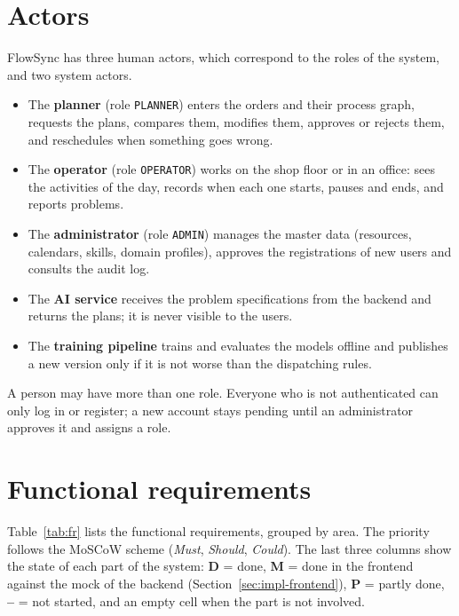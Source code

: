 \section{Actors}
\label{sec:actors}

FlowSync has three human actors, which correspond to the roles of the system, and two system
actors.
\begin{itemize}
  \item The \textbf{planner} (role \texttt{PLANNER}) enters the orders and their process graph,
        requests the plans, compares them, modifies them, approves or rejects them, and
        reschedules when something goes wrong.
  \item The \textbf{operator} (role \texttt{OPERATOR}) works on the shop floor or in an office:
        sees the activities of the day, records when each one starts, pauses and ends, and
        reports problems.
  \item The \textbf{administrator} (role \texttt{ADMIN}) manages the master data (resources,
        calendars, skills, domain profiles), approves the registrations of new users and
        consults the audit log.
  \item The \textbf{AI service} receives the problem specifications from the backend and returns
        the plans; it is never visible to the users.
  \item The \textbf{training pipeline} trains and evaluates the models offline and publishes a
        new version only if it is not worse than the dispatching rules.
\end{itemize}
A person may have more than one role. Everyone who is not authenticated can only log in or
register; a new account stays pending until an administrator approves it and assigns a role.

\section{Functional requirements}
\label{sec:fr}

Table~\ref{tab:fr} lists the functional requirements, grouped by area. The priority follows the
MoSCoW scheme (\emph{Must}, \emph{Should}, \emph{Could}). The last three columns show the state
of each part of the system: \textbf{D} = done, \textbf{M} = done in the frontend against the
mock of the backend (Section~\ref{sec:impl-frontend}), \textbf{P} = partly done, \textbf{--} =
not started, and an empty cell when the part is not involved.

